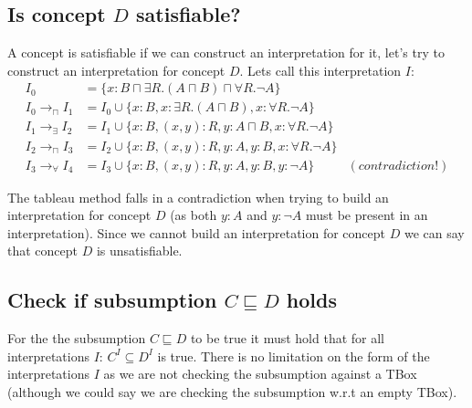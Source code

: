 \documentclass[a4paper,12pt]{article}
\begin{document}
\subsection[Concept D]{Is concept $D$ satisfiable?}
A concept is satisfiable if we can construct an interpretation for it, let's
try to construct an interpretation for concept $D$.  Lets call this
interpretation $I$:
\begin{align*}
I_0 &= \{x : B \sqcap \exists R.(A \sqcap B) \sqcap \forall R.\neg A\}\\
I_0 \to_\sqcap I_1 &= I_0 \cup \{ x : B, x : \exists R.(A \sqcap B)
                                , x : \forall R.\neg A\}\\
I_1 \to_\exists I_2 &= I_1 \cup \{ x : B, (x,y) : R
                                 , y : A \sqcap B, x : \forall R.\neg A\}\\
I_2 \to_\sqcap I_3 &= I_2 \cup \{ x : B, (x,y) : R
                                , y : A, y : B, x : \forall R.\neg A\}\\
I_3 \to_\forall I_4 &= I_3 \cup \{ x : B, (x,y) : R
                                 , y : A, y : B, y : \neg A\} &(contradiction!)
\end{align*}

The tableau method falls in a contradiction when trying to build an
interpretation for concept $D$ (as both $ y : A $ and $ y : \neg A $ must be
present in an interpretation).  Since we cannot build an interpretation for
concept $D$ we can say that concept $D$ is unsatisfiable.

\subsection[Subsumption]{Check if subsumption $C \sqsubseteq D$ holds}
For the the subsumption $ C \sqsubseteq D $ to be true it must hold that for
all interpretations $I$: $ C^I \subseteq D^I $ is true.  There is no limitation
on the form of the interpretations $I$ as we are not checking the subsumption
against a TBox (although we could say we are checking the subsumption w.r.t an
empty TBox).
\end{document}
